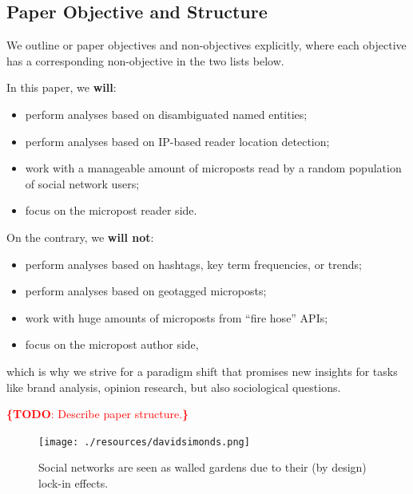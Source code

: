 \documentclass{iosart2c}
\newcommand{\todo}[1]{\noindent\textcolor{red}{{\bf \{TODO}: #1{\bf \}}}}
\begin{document}
\subsection{Paper Objective and Structure}
We outline or paper objectives and non-objectives explicitly, where  each objective has a corresponding non-objective in the two lists below.

\noindent In this paper, we \textbf{will}:
\begin{itemize}%
	\item perform analyses based on disambiguated named entities;
	\item perform analyses based on IP-based reader location detection;
	\item work with a manageable amount of microposts read by a random population of social network users;
	\item focus on the micropost reader side.
\end{itemize}
On the contrary, we \textbf{will not}:
\begin{itemize}%
	\item perform analyses based on hashtags, key term frequencies, or trends;
	\item perform analyses based on geotagged microposts;
	\item work with huge amounts of microposts from ``fire hose'' APIs;
	\item focus on the micropost author side,
\end{itemize}
which is why we strive for a paradigm shift that promises new insights for tasks like brand analysis, opinion research, but also sociological questions.

\todo{Describe paper structure.}

\begin{figure}
\centering
\texttt{[image: ./resources/davidsimonds.png]}
\caption{Social networks are seen as walled gardens due to their (by design) lock-in effects.~\cite{DavidSimonds}}
\label{fig:DavidSimonds}
\end{figure}
\end{document}
